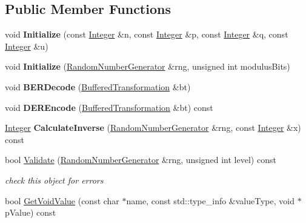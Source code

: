\subsection*{Public Member Functions}
\begin{DoxyCompactItemize}
\item 
\hypertarget{class_invertible_r_w_function_a6087d4bf788bd6beab89699eb7069b86}{
void {\bfseries Initialize} (const \hyperlink{class_integer}{Integer} \&n, const \hyperlink{class_integer}{Integer} \&p, const \hyperlink{class_integer}{Integer} \&q, const \hyperlink{class_integer}{Integer} \&u)}
\label{class_invertible_r_w_function_a6087d4bf788bd6beab89699eb7069b86}

\item 
\hypertarget{class_invertible_r_w_function_a6489b68e2d321e3844b85060ba42f90c}{
void {\bfseries Initialize} (\hyperlink{class_random_number_generator}{RandomNumberGenerator} \&rng, unsigned int modulusBits)}
\label{class_invertible_r_w_function_a6489b68e2d321e3844b85060ba42f90c}

\item 
\hypertarget{class_invertible_r_w_function_a85e6ad506b653b4511bfd14d06aa95b5}{
void {\bfseries BERDecode} (\hyperlink{class_buffered_transformation}{BufferedTransformation} \&bt)}
\label{class_invertible_r_w_function_a85e6ad506b653b4511bfd14d06aa95b5}

\item 
\hypertarget{class_invertible_r_w_function_aa487d8ccbcb409066776ef48721b037a}{
void {\bfseries DEREncode} (\hyperlink{class_buffered_transformation}{BufferedTransformation} \&bt) const }
\label{class_invertible_r_w_function_aa487d8ccbcb409066776ef48721b037a}

\item 
\hypertarget{class_invertible_r_w_function_ae72e7da96f9dc18c80e84bb510aab377}{
\hyperlink{class_integer}{Integer} {\bfseries CalculateInverse} (\hyperlink{class_random_number_generator}{RandomNumberGenerator} \&rng, const \hyperlink{class_integer}{Integer} \&x) const }
\label{class_invertible_r_w_function_ae72e7da96f9dc18c80e84bb510aab377}

\item 
bool \hyperlink{class_invertible_r_w_function_a7f5052834d9716bfc3a5585c6addbd46}{Validate} (\hyperlink{class_random_number_generator}{RandomNumberGenerator} \&rng, unsigned int level) const 
\begin{DoxyCompactList}\small\item\em check this object for errors \item\end{DoxyCompactList}\item 
\hypertarget{class_invertible_r_w_function_abd17ed1b135d340abc325046eebef6ac}{
bool \hyperlink{class_invertible_r_w_function_abd17ed1b135d340abc325046eebef6ac}{GetVoidValue} (const char $\ast$name, const std::type\_\-info \&valueType, void $\ast$pValue) const }
\label{class_invertible_r_w_function_abd17ed1b135d340abc325046eebef6ac}


\end{DoxyCompactItemize}
